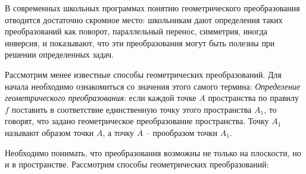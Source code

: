 \documentclass[]{article}
\begin{document}
	В современных школьных программах понятию геометрического преобразования отводится достаточно скромное место: школьникам дают
	определения таких преобразований как поворот, параллельный перенос,
	симметрия, иногда инверсия, и показывают, что эти преобразования могут
	быть полезны при решении определенных задач.
	
	Рассмотрим менее известные способы геометрических преобразований. Для начала необходимо ознакомиться со значения этого самого термина:  
	\textit{Определение геометрического преобразования}: если каждой точке $A$ пространства по правилу $f$ поставить в соответствие единственную точку этого пространства $A_1$, то говорят, что задано геометрическое преобразование пространства. Точку $A_1$ называют образом точки $A$, а точку $A$ – прообразом точки $A_1$.
	
	Необходимо понимать, что преобразования возможны не только на плоскости, но и в пространстве. Рассмотрим способы геометрических преобразований:
	
\end{document}
